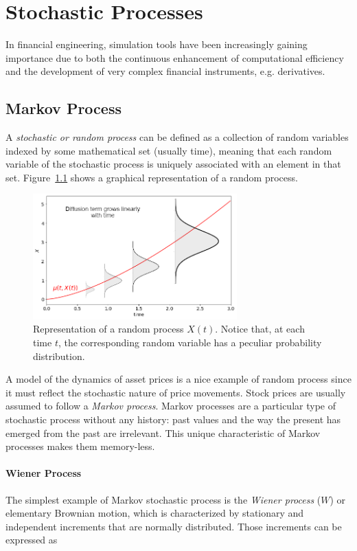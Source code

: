 \chapter{Stochastic Processes}

In financial engineering, simulation tools have been increasingly gaining importance due to both the continuous enhancement of computational efficiency and the development of very complex financial instruments, e.g. derivatives. 

\section{Markov Process}
 
A \emph{stochastic or random process} can be defined as a collection of random variables indexed by some mathematical set (usually time), meaning that each random variable of the stochastic process is uniquely associated with an element in that set. Figure~\ref{fig:random_process} shows a graphical representation of a random process.

\begin{figure}[htb]
\centering
\includegraphics[width=0.7\textwidth]{figures/brownian_process}
\caption{Representation of a random process $X(t)$. Notice that, at each time $t$, the corresponding random variable has a peculiar probability distribution.}
\label{fig:random_process}
\end{figure}

A model of the dynamics of asset prices is a nice example of random process since it must reflect the stochastic nature of price movements. Stock prices are usually assumed to follow a \emph{Markov process}. Markov processes are a particular type of stochastic process without any history: past values and the way the present has emerged from the past are irrelevant. This unique characteristic of Markov processes makes them memory-less.

\subsubsection{Wiener Process}
The simplest example of Markov stochastic process is the \emph{Wiener process} ($W$) or elementary Brownian motion, which is characterized by stationary and independent increments that are normally distributed. Those increments can be expressed as

